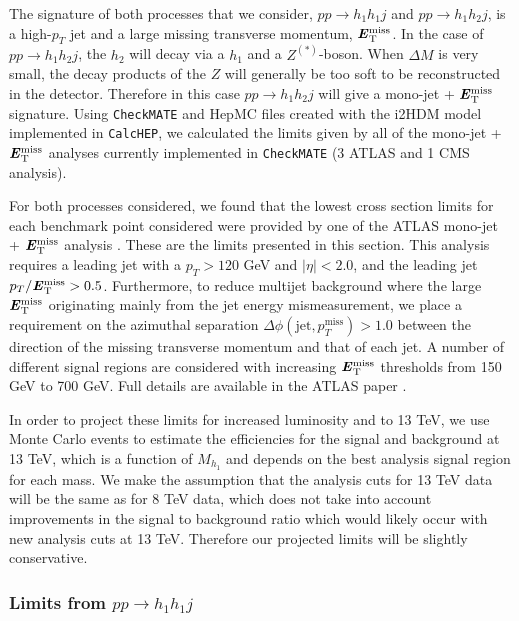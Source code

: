 \documentclass[12pt,a4paper]{article}
\newcommand{\MET}{\textbf{\textit{E}$_{\rm T}^{\rm miss}$}}
\begin{document}
The signature of both processes that we consider, $pp\rightarrow h_1h_1j$  and $pp\rightarrow h_1h_2j$,
is a high-$p_T$ jet and a large missing transverse momentum, $\MET{}$. 
In the case of $pp\rightarrow h_1h_2j$, the $h_2$ will decay via a $h_1$ and a $Z^{(*)}$-boson. When $\Delta M$ is very small, the decay
products of the $Z$ will generally be too soft to be reconstructed in the detector. Therefore in this case $pp\rightarrow h_1h_2j$ will give a mono-jet + $\MET{}$
signature. Using {\tt CheckMATE} and HepMC files created with the i2HDM model implemented in {\tt CalcHEP}, we calculated the limits given by all of the mono-jet +
$\MET{}$ analyses currently implemented in {\tt CheckMATE} \cite{ATLAS:2012zim,Aad:2014nra,Aad:2015zva,Khachatryan:2014rra} (3 ATLAS and 1 CMS analysis).

For both processes considered, we found that the lowest cross section limits for each benchmark point considered were provided by one of the ATLAS mono-jet +
$\MET{}$ analysis \cite{Aad:2015zva}. These are the limits presented in this section. This analysis requires a leading jet with a $p_T > 120$ GeV and $|\eta|
<2.0$, and the leading jet $p_T/\MET > 0.5$. Furthermore, to reduce multijet background where the large $\MET{}$ originating mainly from the jet energy
mismeasurement, we place a requirement on the azimuthal separation $\Delta \phi (\text{jet},p_T^{\text{miss}}) > 1.0$ between the direction of the missing transverse momentum
and that of each jet. A number of different signal regions are considered with increasing $\MET{}$ thresholds from 150 GeV to 700 GeV. Full details are available in
the ATLAS paper \cite{Aad:2015zva}.

In order to project these limits for increased luminosity and to 13 TeV, we use Monte Carlo events to estimate the efficiencies for the signal and background at 13 TeV, which
is a function of $M_{h_1}$ and depends on the best analysis signal region for each mass. We make the assumption that the analysis cuts for 13 TeV data will be the same as for
8 TeV data, which does not take into account improvements in the signal to background ratio which would likely occur with new analysis cuts at 13 TeV. Therefore our projected
limits will be slightly conservative.

\subsubsection{Limits from $pp\rightarrow h_1h_1 j$}
\end{document}
